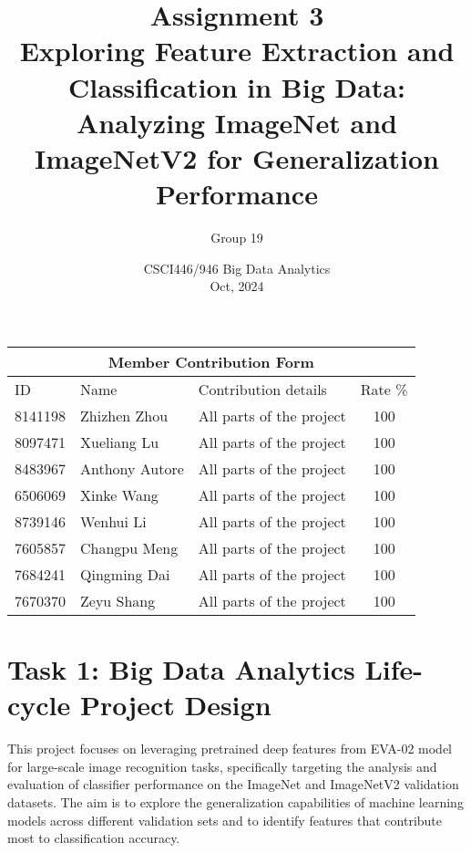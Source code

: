 \documentclass[a4paper,11pt]{article}
\title{Assignment 3\\ Exploring Feature Extraction and Classification in Big Data: Analyzing ImageNet and ImageNetV2 for Generalization Performance}
\author{Group 19}
\date{CSCI446/946 Big Data Analytics\\
Oct, 2024}
\begin{document}
\maketitle
\begin{table}[hbt!]
    \centering
    \begin{tabular}{llp{6cm}c} 
         \multicolumn{4}{c}{\textbf{Member Contribution Form}}\\ \hline 
         ID&  Name&  Contribution details& Rate \% 
\\ \hline 
         8141198&  Zhizhen Zhou& All parts of the project & 100 
\\ 
         8097471&  Xueliang Lu& All parts of the project & 100 
\\  
         8483967&  Anthony Autore& All parts of the project & 100 
\\ 
         6506069&  Xinke Wang& All parts of the project & 100 
\\ 
         8739146&  Wenhui Li& All parts of the project & 100 
\\  
         7605857&  Changpu Meng& All parts of the project & 100 
\\  
         7684241&  Qingming Dai& All parts of the project & 100 
\\  
         7670370&  Zeyu Shang& All parts of the project & 100 
\\ \hline
    \end{tabular}
\end{table}

\onehalfspacing

    \begin{abstract}
   
    \end{abstract}
\newpage
\tableofcontents
\newpage



\section{Task 1: Big Data Analytics Life-cycle Project Design}

This project focuses on leveraging pretrained deep features from EVA-02 model for large-scale image recognition tasks, specifically targeting the analysis and evaluation of classifier performance on the ImageNet and ImageNetV2 validation datasets. The aim is to explore the generalization capabilities of machine learning models across different validation sets and to identify features that contribute most to classification accuracy.
\end{document}
